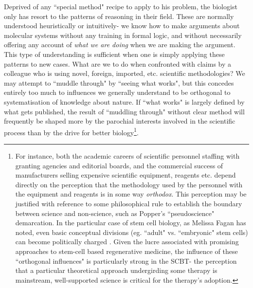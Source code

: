 Deprived of any ``special method" recipe to apply to his problem, the biologist only has resort to the patterns of reasoning in their field. These are normally understood heuristically or intuitively- we know how to make arguments about molecular systems without any training in formal logic, and without necessarily offering any account of \textit{what we are doing} when we are making the argument. This type of understanding is sufficient when one is simply applying these patterns to new cases. What are we to do when confronted with claims by a colleague who is using novel, foreign, imported, etc. scientific methodologies? We may attempt to ``muddle through" by ``seeing what works", but this concedes entirely too much to influences we generally understand to be orthogonal to systematisation of knowledge about nature. If ``what works" is largely defined by what gets published, the result of ``muddling through" without clear method will frequently be shaped more by the parochial interests involved in the scientific process than by the drive for better biology\footnote{For instance, both the academic careers of scientific personnel staffing with granting agencies and editorial boards, and the commercial success of manufacturers selling expensive scientific equipment, reagents etc. depend directly on the perception that the methodology used by the personnel with the equipment and reagents is in some way \textit{orthodox}. This perception may be justified with reference to some philosophical rule to establish the boundary between science and non-science, such as Popper's ``pseudoscience" demarcation. In the particular case of stem cell biology, as Melissa Fagan has noted, even basic conceptual divisions (eg. ``adult" vs. ``embryonic" stem cells) can become politically charged \cite[p.47]{Fagan2013}. Given the lucre associated with promising approaches to stem-cell based regenerative medicine, the influence of these ``orthogonal influences" is particularly strong in the SCBT- the perception that a particular theoretical approach undergirding some therapy is mainstream, well-supported science is critical for the therapy's adoption.}.

